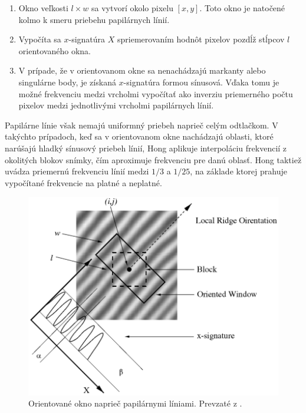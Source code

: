   \begin{enumerate}
    \item Okno veľkosti $l \times{} w$ sa vytvorí okolo pixelu $[x,y]$. Toto okno je natočené kolmo k smeru priebehu papilárnych línií.
    \item Vypočíta sa $x$-signatúra $X$ spriemerovaním hodnôt pixelov pozdĺž stĺpcov $l$ orientovaného okna.
    \item V prípade, že v orientovanom okne sa nenachádzajú markanty alebo singulárne body, je získaná $x$-signatúra formou sínusová. Vďaka tomu je
          možné frekvenciu medzi vrcholmi vypočítať ako inverziu priemerného počtu pixelov medzi jednotlivými vrcholmi papilárnych línií.
  \end{enumerate}
  Papilárne línie však nemajú uniformný priebeh naprieč celým odtlačkom. V takýchto prípadoch, keď sa v orientovanom okne nachádzajú oblasti, ktoré narúšajú
  hladký sínusový priebeh línií, Hong aplikuje interpoláciu frekvencií z okolitých blokov snímky, čím aproximuje frekvenciu pre danú oblasť. Hong taktiež uvádza
  priemernú frekvenciu línií medzi $1/3$ a $1/25$, na základe ktorej prahuje vypočítané frekvencie na platné a neplatné.

  \begin{figure}[h]
    \centering
    \includegraphics[width=0.8\linewidth]{obrazky-figures/frekvencia-Hong.png} %
    \caption{Orientované okno naprieč papilárnymi líniami. Prevzaté z \cite{Hong}.}
    \label{obr:frekvencia-Hong}
  \end{figure}

